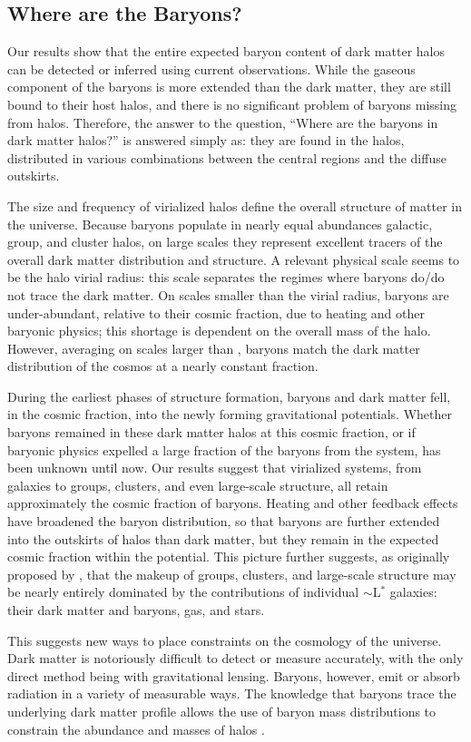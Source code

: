 \subsection{Where are the Baryons?}
\label{sec:Implications.Where}

Our results show that the entire expected baryon content of dark
matter halos can be detected or inferred using current
observations. While the gaseous component of the baryons is more
extended than the dark matter, they are still bound to their host
halos, and there is no significant problem of baryons missing from
halos. Therefore, the answer to the question, ``Where are the baryons
in dark matter halos?'' is answered simply as: they are found in
the halos, distributed in various combinations between the central
regions and the diffuse outskirts.

The size and frequency of virialized halos define the overall
structure of matter in the universe. Because baryons populate in
nearly equal abundances galactic, group, and cluster halos, on large
scales they represent excellent tracers of the overall dark matter
distribution and structure. A relevant physical scale seems to be the
halo virial radius: this scale separates the regimes where baryons
do/do not trace the dark matter. On scales smaller than the virial
radius, baryons are under-abundant, relative to their cosmic fraction,
due to heating and other baryonic physics; this shortage is dependent
on the overall mass of the halo. However, averaging on scales larger
than \rvir{}, baryons match the dark matter distribution of the cosmos
at a nearly constant fraction.

During the earliest phases of structure formation, baryons and dark
matter fell, in the cosmic fraction, into the newly forming
gravitational potentials. Whether baryons remained in these dark
matter halos at this cosmic fraction, or if baryonic physics expelled
a large fraction of the baryons from the system, has been unknown
until now. Our results suggest that virialized systems, from galaxies
to groups, clusters, and even large-scale structure, all retain
approximately the cosmic fraction of baryons. Heating and other
feedback effects have broadened the baryon distribution, so that
baryons are further extended into the outskirts of halos than dark
matter, but they remain in the expected cosmic fraction within the
potential. This picture further suggests, as originally proposed by
\citet{Bahcall2014}, that the makeup of groups, clusters, and
large-scale structure may be nearly entirely dominated by the
contributions of individual $\sim$L$^*$ galaxies: their dark matter
and baryons, gas, and stars.

This suggests new ways to place constraints on the cosmology of the
universe. Dark matter is notoriously difficult to detect or measure
accurately, with the only direct method being with gravitational
lensing. Baryons, however, emit or absorb radiation in a variety of
measurable ways. The knowledge that baryons trace the underlying dark
matter profile allows the use of baryon mass distributions to
constrain the abundance and masses of halos .

